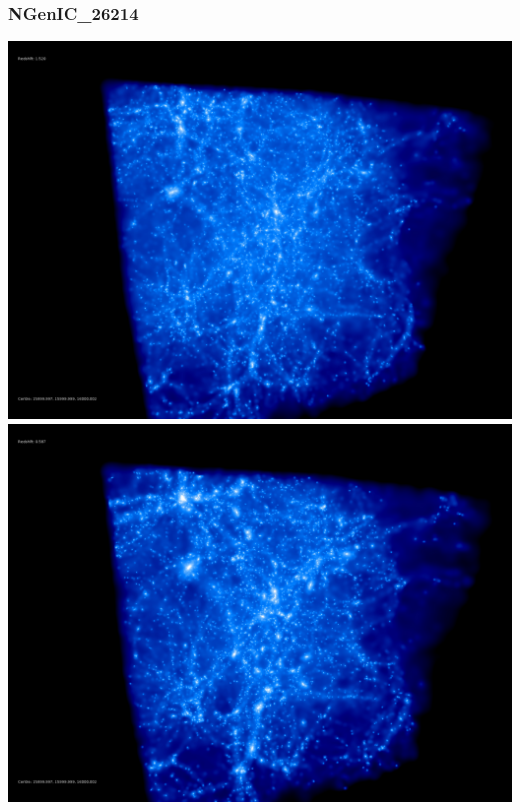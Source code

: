 \newpage
\subsubsection{NGenIC\_26214}

\includegraphics[scale=0.1]{r256/h100/NGenIC_26214/50.jpg} 
\includegraphics[scale=0.1]{r256/h100/NGenIC_26214/100.jpg}  \\

